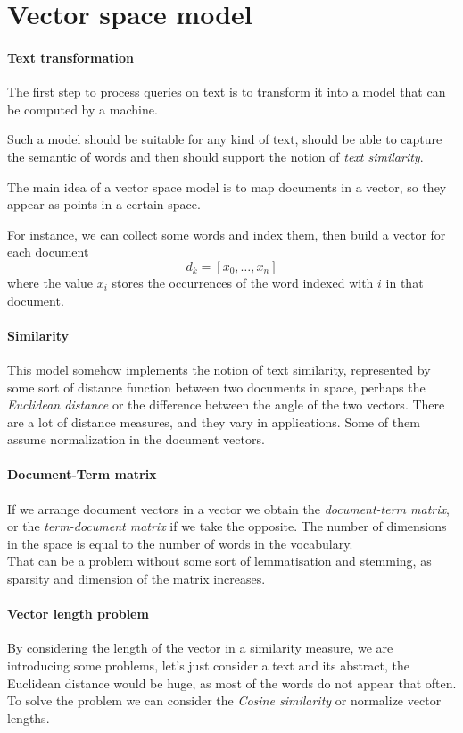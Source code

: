\section{Vector space model}
\label{vect-vect-model}

\paragraph{Text transformation}
The first step to process queries on text is to transform 
it into a model that can be computed by a machine.

Such a model should be suitable for any kind of text, should be able 
to capture the semantic of words and then should support the notion of
\emph{text similarity}.

The main idea of a vector space model is to map documents in a vector, 
so they appear as points in a certain space.

For instance, we can collect some words and index them, then build a vector 
for each document $$d_k = [x_0, \dots, x_n]$$
where the value $x_i$ stores the occurrences of the word indexed with $i$ 
in that document.

\paragraph{Similarity} 
This model somehow implements the notion of text similarity, represented 
by some sort of distance function between two documents in space, perhaps 
the \emph{Euclidean distance} or the difference between the angle of the two 
vectors.
There are a lot of distance measures, and they vary in applications.
Some of them assume normalization in the document vectors.


\paragraph{Document-Term matrix}
If we arrange document vectors in a vector we obtain the 
\emph{document-term matrix}, or the \emph{term-document matrix} if 
we take the opposite.
The number of dimensions in the space is equal to the 
number of words in the vocabulary. \\
That can be a problem without some sort of lemmatisation and stemming, 
as sparsity and dimension of the matrix increases.

\paragraph{Vector length problem}
By considering the length of the vector in a similarity measure, 
we are introducing some problems, let's just consider a text and its 
abstract, the Euclidean distance would be huge, as most of the words do not 
appear that often. \\
To solve the problem we can consider the \emph{Cosine similarity} or 
normalize vector lengths.

